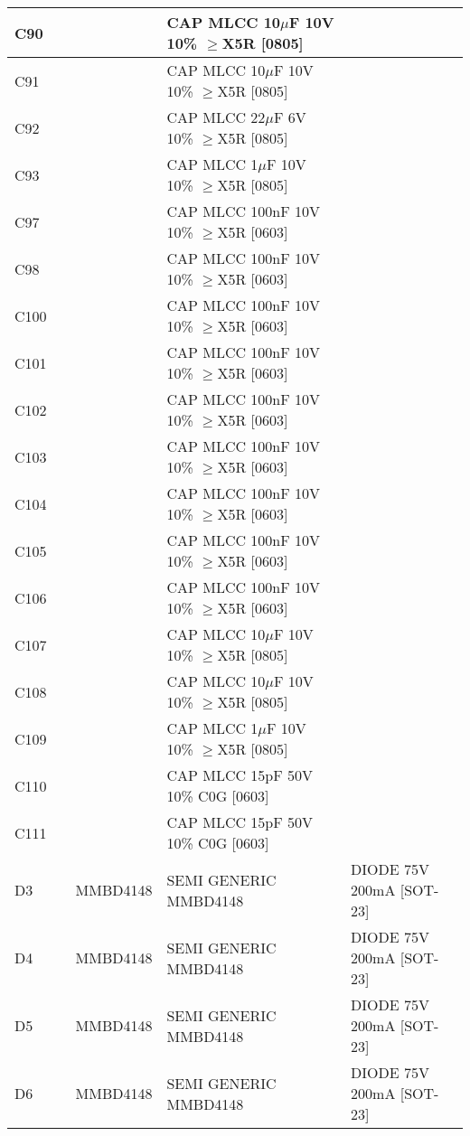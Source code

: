 \begin{longtable}{|l|l|l|l|l|}
\hline
C90 &  &  & CAP MLCC 10\ensuremath{\mu}F 10V 10\% \ensuremath{\geq}X5R [0805] &  \\
\hline
C91 &  &  & CAP MLCC 10\ensuremath{\mu}F 10V 10\% \ensuremath{\geq}X5R [0805] &  \\
\hline
C92 &  &  & CAP MLCC 22\ensuremath{\mu}F 6V 10\% \ensuremath{\geq}X5R [0805] &  \\
\hline
C93 &  &  & CAP MLCC 1\ensuremath{\mu}F 10V 10\% \ensuremath{\geq}X5R [0805] &  \\
\hline
C97 &  &  & CAP MLCC 100nF 10V 10\% \ensuremath{\geq}X5R [0603] &  \\
\hline
C98 &  &  & CAP MLCC 100nF 10V 10\% \ensuremath{\geq}X5R [0603] &  \\
\hline
C100 &  &  & CAP MLCC 100nF 10V 10\% \ensuremath{\geq}X5R [0603] &  \\
\hline
C101 &  &  & CAP MLCC 100nF 10V 10\% \ensuremath{\geq}X5R [0603] &  \\
\hline
C102 &  &  & CAP MLCC 100nF 10V 10\% \ensuremath{\geq}X5R [0603] &  \\
\hline
C103 &  &  & CAP MLCC 100nF 10V 10\% \ensuremath{\geq}X5R [0603] &  \\
\hline
C104 &  &  & CAP MLCC 100nF 10V 10\% \ensuremath{\geq}X5R [0603] &  \\
\hline
C105 &  &  & CAP MLCC 100nF 10V 10\% \ensuremath{\geq}X5R [0603] &  \\
\hline
C106 &  &  & CAP MLCC 100nF 10V 10\% \ensuremath{\geq}X5R [0603] &  \\
\hline
C107 &  &  & CAP MLCC 10\ensuremath{\mu}F 10V 10\% \ensuremath{\geq}X5R [0805] &  \\
\hline
C108 &  &  & CAP MLCC 10\ensuremath{\mu}F 10V 10\% \ensuremath{\geq}X5R [0805] &  \\
\hline
C109 &  &  & CAP MLCC 1\ensuremath{\mu}F 10V 10\% \ensuremath{\geq}X5R [0805] &  \\
\hline
C110 &  &  & CAP MLCC 15pF 50V 10\% C0G [0603] &  \\
\hline
C111 &  &  & CAP MLCC 15pF 50V 10\% C0G [0603] &  \\
\hline
D3 &  & MMBD4148 & SEMI GENERIC MMBD4148 & DIODE 75V 200mA [SOT-23] \\
\hline
D4 &  & MMBD4148 & SEMI GENERIC MMBD4148 & DIODE 75V 200mA [SOT-23] \\
\hline
D5 &  & MMBD4148 & SEMI GENERIC MMBD4148 & DIODE 75V 200mA [SOT-23] \\
\hline
D6 &  & MMBD4148 & SEMI GENERIC MMBD4148 & DIODE 75V 200mA [SOT-23] \\

\end{longtable}

